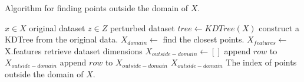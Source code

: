 \begin{algorithm}[H]
  \caption{Algorithm for finding points outside the domain of $X$.}
  \begin{algorithmic}
    \Require $x \in X$  \Comment original dataset
    \Require $z \in Z$ \Comment perturbed dataset
    \State $tree \gets KDTree(X)$ \Comment construct a KDTree from the original data.
    \State $X_{domain} \gets$  \Comment find the closest points.
    \State $X_{features} \gets$ X.features \Comment retrieve dataset dimensions
    \State $X_{outside-domain} \gets []$
    \State append $row$ to $X_{outside-domain}$
    \EndIf
    \State append $row$ to $X_{outside-domain}$
    \EndIf
    \EndFor
    \EndFor
    \State \Return $X_{outside-domain}$ \Comment The index of points outside the domain of $X$.
  \end{algorithmic}
  \label{alg:find-outside-domain-laplace}
\end{algorithm}